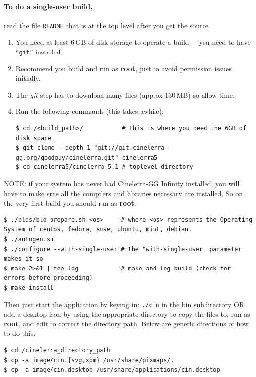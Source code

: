 \paragraph{To do a single-user build,} read the file \texttt{README} that is at the top level after you get the source.
\begin{enumerate}
    \item  You need at least 6\,GB of disk storage to operate a build + you need to have  “\texttt{git}” installed.
    \item  Recommend you build and run as \textbf{root}, just to avoid permission issues initially.
    \item  The \textit{git} step has to download many files (approx 130\,MB) so allow time.
    \item  Run the following commands (this takes awhile):
        \begin{lstlisting}[numbers=none]
$ cd /<build_path>/           # this is where you need the 6GB of disk space
$ git clone --depth 1 "git://git.cinelerra-gg.org/goodguy/cinelerra.git" cinelerra5 
$ cd cinelerra5/cinelerra-5.1 # toplevel directory
        \end{lstlisting}
\end{enumerate}

NOTE: if your system has never had Cinelerra-GG Infinity installed, you will have to make sure all
the compilers and libraries necessary are installed. So on the very first build you should run as \textbf{root}:

\begin{lstlisting}[numbers=none]
$ ./blds/bld_prepare.sh <os>     # where <os> represents the Operating System of centos, fedora, suse, ubuntu, mint, debian.
$ ./autogen.sh
$ ./configure --with-single-user # the "with-single-user" parameter makes it so
$ make 2>&1 | tee log            # make and log build (check for errors before proceeding)
$ make install
\end{lstlisting}

Then just start the application by keying in: \texttt{./cin} in the bin subdirectory OR add a desktop icon by
using the appropriate directory to copy the files to, run as \textbf{root}, and edit to correct
the directory path.  Below are generic directions of how to do this.

\begin{lstlisting}[numbers=none]
$ cd /cinelerra_directory_path
$ cp -a image/cin.{svg,xpm} /usr/share/pixmaps/.
$ cp -a image/cin.desktop /usr/share/applications/cin.desktop
\end{lstlisting}

